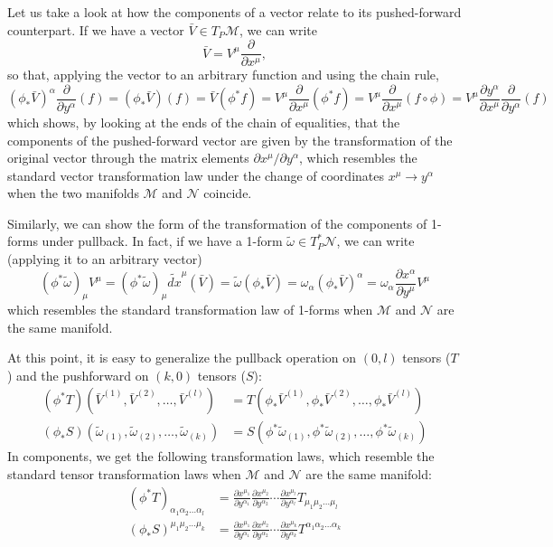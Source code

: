\documentclass[a4paper]{article}
\begin{document}
Let us take a look at how the components of a vector relate to its pushed-forward counterpart. If we have a vector $\bar{V} \in T_P\mathcal{M}$, we can write
$$\bar{V} = V^{\mu}\frac{\partial}{\partial x^{\mu}},$$
so that, applying the vector to an arbitrary function and using the chain rule,
$$(\phi_*\bar{V})^{\alpha}\frac{\partial}{\partial y^\alpha}(f) = (\phi_*\bar{V})(f) = \bar{V}(\phi^*f) = V^{\mu}\frac{\partial}{\partial x^{\mu}}(\phi^* f) = V^{\mu}\frac{\partial}{\partial x^{\mu}}(f \circ \phi) = V^{\mu}\frac{\partial y^{\alpha}}{\partial x^{\mu}}\frac{\partial}{\partial y^{\alpha}}(f)$$
which shows, by looking at the ends of the chain of equalities, that the components of the pushed-forward vector are given by the transformation of the original vector through the matrix elements $\partial x^{\mu}/\partial y^{\alpha}$, which resembles the standard vector transformation law under the change of coordinates $x^{\mu} \rightarrow y^{\alpha}$ when the two manifolds $\mathcal{M}$ and $\mathcal{N}$ coincide.

Similarly, we can show the form of the transformation of the components of 1-forms under pullback. In fact, if we have a 1-form $\tilde{\omega} \in T^*_P\mathcal{N}$, we can write (applying it to an arbitrary vector)
$$(\phi^*\tilde{\omega})_{\mu} V^{\mu} = (\phi^*\tilde{\omega})_{\mu}\tilde{dx}^{\mu}(\bar{V}) = \tilde{\omega}(\phi_*\bar{V}) = \omega_{\alpha}(\phi_*\bar{V})^{\alpha} = \omega_{\alpha} \frac{\partial x^{\alpha}}{\partial y^{\mu}} V^{\mu}$$
which resembles the standard transformation law of 1-forms when $\mathcal{M}$ and $\mathcal{N}$ are the same manifold.

At this point, it is easy to generalize the pullback operation on $(0,l)$ tensors ($T$) and the pushforward on $(k,0)$ tensors ($S$):
\begin{align*}
  (\phi^*T)(\bar{V}^{(1)}, \bar{V}^{(2)}, \ldots, \bar{V}^{(l)}) &= T(\phi_*\bar{V}^{(1)},\phi_*\bar{V}^{(2)},\ldots,\phi_*\bar{V}^{(l)})\\
  (\phi_*S)(\tilde{\omega}_{(1)}, \tilde{\omega}_{(2)}, \ldots, \tilde{\omega}_{(k)}) &= S(\phi^*\tilde{\omega}_{(1)},\phi^*\tilde{\omega}_{(2)},\ldots,\phi^*\tilde{\omega}_{(k)})
\end{align*}
In components, we get the following transformation laws, which resemble the standard tensor transformation laws when $\mathcal{M}$ and $\mathcal{N}$ are the same manifold:
\begin{align*}
    (\phi^* T)_{\alpha_1 \alpha_2 \ldots \alpha_l} &= \frac{\partial x^{\mu_1}}{\partial y^{\alpha_1}}\frac{\partial x^{\mu_2}}{\partial y^{\alpha_2}}\cdots \frac{\partial x^{\mu_l}}{\partial y^{\alpha_l}}T_{\mu_1 \mu_2 \ldots \mu_l}\\
    (\phi_* S)^{\mu_1 \mu_2 \ldots \mu_k} &= \frac{\partial x^{\mu_1}}{\partial y^{\alpha_1}}\frac{\partial x^{\mu_2}}{\partial y^{\alpha_2}}\cdots \frac{\partial x^{\mu_k}}{\partial y^{\alpha_k}} T^{\alpha_1 \alpha_2\ldots \alpha_k}
\end{align*}
\end{document}
